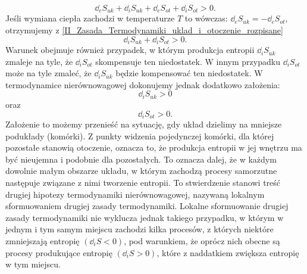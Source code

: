 \documentclass[10pt, a4paper, twoside, onecolumn]{article}
\numberwithin{equation}{section}
\begin{document}
	
	\begin{equation}\label{II_Zasada_Termodynamiki_uklad_i_otoczenie_rozpisane}
		\dd_{e}S_{uk}+\dd_{i}S_{uk}+\dd_{e}S_{ot}+\dd_{i}S_{ot}>0.
	\end{equation}
	Jeśli wymiana ciepła zachodzi w temperaturze \(T\) to wówczas: \(\dd_{e}S_{uk}=-\dd_{e}S_{ot}\), otrzymujemy z \eqref{II_Zasada_Termodynamiki_uklad_i_otoczenie_rozpisane} 
	\begin{equation}\label{}
		\dd_{i}S_{uk}+\dd_{i}S_{ot}>0.
	\end{equation}
	Warunek obejmuje również przypadek, w którym produkcja entropii \(\dd_{i}S_{uk}\) zmaleje na tyle, że \(\dd_{i}S_{ot}\) skompensuje ten niedostatek. W innym przypadku \(\dd_{i}S_{ot}\) może na tyle zmaleć, że \(\dd_{i}S_{uk}\) będzie kompensować ten niedostatek. W termodynamice nierównowagowej dokonujemy jednak dodatkowo założenia:
	\begin{equation*}
		\dd_{i}S_{uk}>0
	\end{equation*}
	oraz
	\begin{equation*}
		\dd_{i}S_{ot}>0.
	\end{equation*}
	Założenie to możemy przenieść na sytuację, gdy układ dzielimy na mniejsze podukłady (komórki). Z punkty widzenia pojedynczej komórki, dla której pozostałe stanowią otoczenie, oznacza to, że produkcja entropii w jej wnętrzu ma być nieujemna i podobnie dla pozostałych. To oznacza dalej, że w każdym dowolnie małym obszarze układu, w którym zachodzą procesy samorzutne następuje związane z nimi tworzenie entropii. To stwierdzenie stanowi treść drugiej hipotezy termodynamiki nierównowagowej, nazywaną lokalnym sformuowaniem drugiej zasady termodynamiki. Lokalne sformuowanie drugiej zasady termodynamiki nie wyklucza jednak takiego przypadku, w którym w jednym i tym samym miejscu zachodzi kilka procesów, z których niektóre zmniejszają entropię \((\dd_{i}S<0)\), pod warunkiem, że oprócz nich obecne są procesy produkujące entropię \((\dd_{i}S>0)\), które z naddatkiem zwiększa entropię w tym miejscu. \cite{orlik, pigon1}
	
\end{document}
